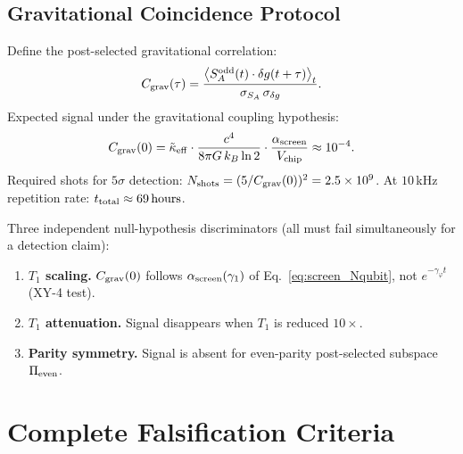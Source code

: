 \documentclass[12pt]{article}
\begin{document}
\subsection{Gravitational Coincidence Protocol}

Define the post-selected gravitational correlation:
\begin{equation}
C_{\rm grav}(\tau)
= \frac{\bigl\langle S_A^{\rm odd}(t)\cdot\delta g(t+\tau)\bigr\rangle_t}{\sigma_{S_A}\,\sigma_{\delta g}}.
\label{eq:C_grav}
\end{equation}
Expected signal under the gravitational coupling hypothesis:
\begin{equation}
C_{\rm grav}(0)
= \tilde{\kappa}_{\rm eff}\cdot\frac{c^4}{8\pi G\,k_B\ln 2}
\cdot\frac{\alpha_{\rm screen}}{V_{\rm chip}}
\approx 10^{-4}.
\label{eq:signal_size}
\end{equation}
Required shots for $5\sigma$ detection:
$N_{\rm shots} = (5/C_{\rm grav}(0))^2 = 2.5\times 10^9$.
At $10\,$kHz repetition rate: $t_{\rm total} \approx 69\,{\rm hours}$.

Three independent null-hypothesis discriminators (all must fail simultaneously for a
detection claim):
\begin{enumerate}
\item \textbf{$T_1$ scaling.} $C_{\rm grav}(0)$ follows $\alpha_{\rm screen}(\gamma_1)$ of
Eq.~\eqref{eq:screen_Nqubit}, not $e^{-\gamma_\varphi t}$ (XY-4 test).
\item \textbf{$T_1$ attenuation.} Signal disappears when $T_1$ is reduced $10\times$.
\item \textbf{Parity symmetry.} Signal is absent for even-parity post-selected subspace
$\Pi_{\rm even}$.
\end{enumerate}

\section{Complete Falsification Criteria}
\label{sec:falsification}
\end{document}
